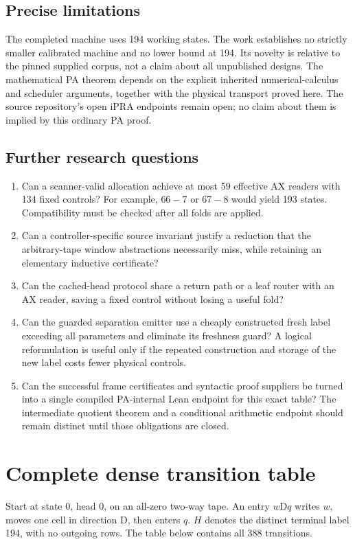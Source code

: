 \documentclass[11pt]{article}
\begin{document}
\subsection{Precise limitations}

The completed machine uses 194 working states. The work establishes no
strictly smaller calibrated machine and no lower bound at 194. Its
novelty is relative to the pinned supplied corpus, not a claim about all
unpublished designs. The mathematical PA theorem depends on the
explicit inherited numerical-calculus and scheduler arguments, together
with the physical transport proved here. The source repository's open
iPRA endpoints remain open; no claim about them is implied by this
ordinary PA proof.

\subsection{Further research questions}

\begin{enumerate}
\item Can a scanner-valid allocation achieve at most 59 effective AX
readers with 134 fixed controls? For example, $66-7$ or $67-8$ would yield
193 states. Compatibility must be checked after all folds are applied.
\item Can a controller-specific source invariant justify a reduction that
the arbitrary-tape window abstractions necessarily miss, while retaining
an elementary inductive certificate?
\item Can the cached-head protocol share a return path or a leaf router
with an AX reader, saving a fixed control without losing a useful fold?
\item Can the guarded separation emitter use a cheaply constructed fresh
label exceeding all parameters and eliminate its freshness guard? A
logical reformulation is useful only if the repeated construction and
storage of the new label costs fewer physical controls.
\item Can the successful frame certificates and syntactic proof suppliers
be turned into a single compiled PA-internal Lean endpoint for this exact
table? The intermediate quotient theorem and a conditional arithmetic
endpoint should remain distinct until those obligations are closed.
\end{enumerate}

\clearpage
\appendix
\section{Complete dense transition table}\label{app:table}
\noindent Start at state 0, head 0, on an all-zero two-way tape. An entry
$w\mathrm{D}q$ writes $w$, moves one cell in direction $\mathrm{D}$, then
enters $q$. $H$ denotes the distinct terminal label 194, with no outgoing
rows. The table below contains all 388 transitions.

\end{document}
